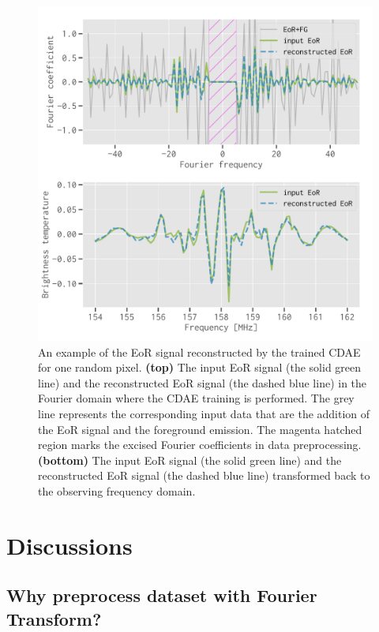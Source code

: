 \documentclass[letters,fleqn,usenatbib,onecolumn]{mnras}
\begin{document}
\begin{figure}
  \centering
  \includegraphics[width=\myfigwidth]{eor-result}
  \caption{\label{fig:result}%
    An example of the EoR signal reconstructed by the trained CDAE for
    one random pixel.
    \textbf{(top)} The input EoR signal (the solid green line) and the
    reconstructed EoR signal (the dashed blue line) in the Fourier domain
    where the CDAE training is performed.
    The grey line represents the corresponding input data that are the
    addition of the EoR signal and the foreground emission.
    The magenta hatched region marks the excised Fourier coefficients
    in data preprocessing.
    \textbf{(bottom)} The input EoR signal (the solid green line) and
    the reconstructed EoR signal (the dashed blue line) transformed back
    to the observing frequency domain.
  }
\end{figure}


\section{Discussions}
\label{sec:discussions}

\subsection{Why preprocess dataset with Fourier Transform?}
\label{sec:why-ft}
\end{document}

